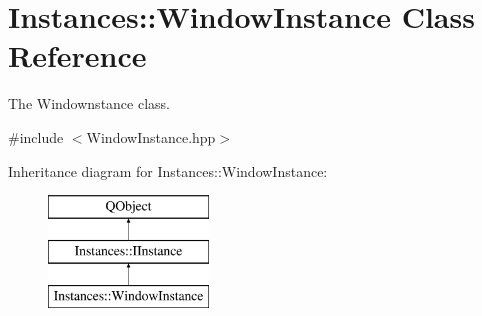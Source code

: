 \hypertarget{classInstances_1_1WindowInstance}{\section{Instances\+:\+:Window\+Instance Class Reference}
\label{classInstances_1_1WindowInstance}
}


The Windownstance class.  




{\ttfamily \#include $<$Window\+Instance.\+hpp$>$}

Inheritance diagram for Instances\+:\+:Window\+Instance\+:\begin{figure}[H]
\begin{center}
\leavevmode
\includegraphics[height=3.000000cm]{classInstances_1_1WindowInstance}
\end{center}
\end{figure}
